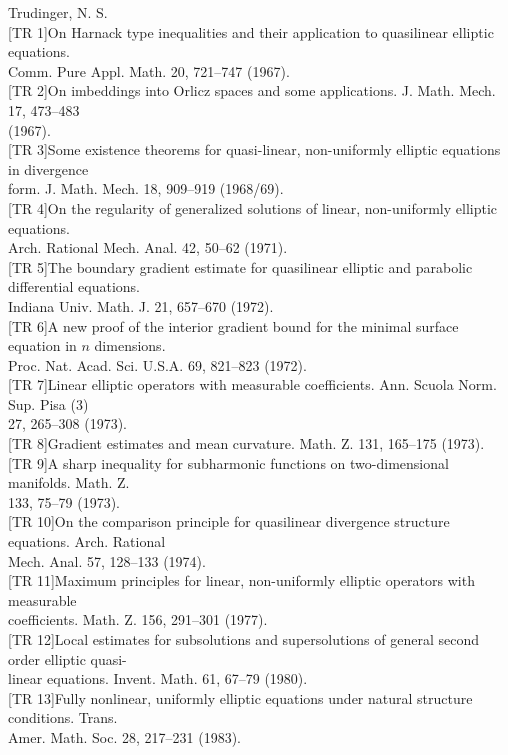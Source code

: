 \begin{flushleft}
Trudinger, N. S.\\
{}[TR 1]\quad On Harnack type inequalities and their application to quasilinear elliptic equations.\\
Comm. Pure Appl. Math. 20, 721--747 (1967).\\
{}[TR 2]\quad On imbeddings into Orlicz spaces and some applications. J. Math. Mech. 17, 473--483\\
(1967).\\
{}[TR 3]\quad Some existence theorems for quasi-linear, non-uniformly elliptic equations in divergence\\
form. J. Math. Mech. 18, 909--919 (1968/69).\\
{}[TR 4]\quad On the regularity of generalized solutions of linear, non-uniformly elliptic equations.\\
Arch. Rational Mech. Anal. 42, 50--62 (1971).\\
{}[TR 5]\quad The boundary gradient estimate for quasilinear elliptic and parabolic differential equations.\\
Indiana Univ. Math. J. 21, 657--670 (1972).\\
{}[TR 6]\quad A new proof of the interior gradient bound for the minimal surface equation in $n$ dimensions.\\
Proc. Nat. Acad. Sci. U.S.A. 69, 821--823 (1972).\\
{}[TR 7]\quad Linear elliptic operators with measurable coefficients. Ann. Scuola Norm. Sup. Pisa (3)\\
27, 265--308 (1973).\\
{}[TR 8]\quad Gradient estimates and mean curvature. Math. Z. 131, 165--175 (1973).\\
{}[TR 9]\quad A sharp inequality for subharmonic functions on two-dimensional manifolds. Math. Z.\\
133, 75--79 (1973).\\
{}[TR 10]\quad On the comparison principle for quasilinear divergence structure equations. Arch. Rational\\
Mech. Anal. 57, 128--133 (1974).\\
{}[TR 11]\quad Maximum principles for linear, non-uniformly elliptic operators with measurable\\
coefficients. Math. Z. 156, 291--301 (1977).\\
{}[TR 12]\quad Local estimates for subsolutions and supersolutions of general second order elliptic quasi-\\
linear equations. Invent. Math. 61, 67--79 (1980).\\
{}[TR 13]\quad Fully nonlinear, uniformly elliptic equations under natural structure conditions. Trans.\\
Amer. Math. Soc. 28, 217--231 (1983).
\end{flushleft}

